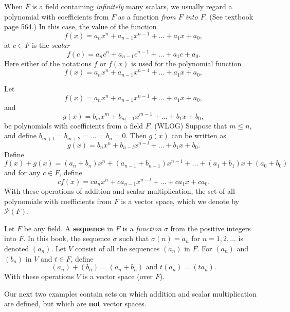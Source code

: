 \begin{note}
When \(F\) is a field containing \emph{infinitely} many scalars, we usually regard a polynomial with coefficients from \(F\) as a function \emph{from \(F\) into \(F\)}.
(See textbook page 564.)
In this case, the value of the function
\[
    f(x) = a_n x^n + a_{n - 1} x^{n - 1} + ... + a_1 x + a_0,
\]
at \(c \in F\) is the \emph{scalar}
\[
    f(c) = a_n c^n + a_{n - 1} c^{n - 1} + ... + a_1 c + a_0.
\]
Here either of the notations \(f\) or \(f(x)\) is used for the polynomial function
\[
    f(x) = a_n x^n + a_{n - 1} x^{n - 1} + ... + a_1 x + a_0,
\]
\end{note}

\begin{example} \label{example 1.2.4}
Let
\[
    f(x) = a_n x^n + a_{n - 1} x^{n - 1} + ... + a_1 x + a_0,
\]
and
\[
    g(x) = b_m x^m + b_{m - 1} x^{m - 1} + ... + b_1 x + b_0,
\]
be polynomials with coefficients from a field \(F\).
(WLOG) Suppose that \(m \le n\), and define \(b_{m+l} = b_{m+2} = ... = b_n = 0\).
Then \(g(x)\) can be written as
\[
    g(x) = b_n x^n + b_{n - l} x^{n - l} + ... + b_1 x + b_0.
\]
Define
\[
    f(x) + g(x) = (a_n + b_n) x^n + (a_{n - 1} + b_{n - 1}) x^{n - 1} + ... + (a_1 + b_1) x + (a_0 + b_0)
\]
and for any \(c \in F\), define
\[
    cf(x) = c {a_n} x^n + c a_{n-1} x^{n-l} + ... + c a_1 x + c a_0.
\]
With these operations of addition and scalar multiplication, the set of all polynomials with coefficients from \(F\) is a vector space, which we denote by \(\mathcal{P}(F)\).
\end{example}

\begin{example} \label{example 1.2.5}
Let \(F\) be any field.
A \textbf{sequence} in \(F\) is a \emph{function} \(\sigma\) from the positive integers into \(F\).
In this book, the sequence \(\sigma\) such that \(\sigma(n) = a_n\) for \(n = 1, 2, ...\) is denoted \((a_n)\).
Let \(V\) consist of all the sequences \((a_n)\) in \(F\).
For \((a_n)\) and \((b_n)\) in \(V\) and \(t \in F\), define
\[
    (a_n) + (b_n) = (a_n + b_n) \text{ and } t(a_n) = (t a_n).
\]
With these operations \(V\) is a vector space (over \(F\)).
\end{example}

Our next two examples contain sets on which addition and scalar multiplication are defined, but which are \textbf{not} vector spaces.

